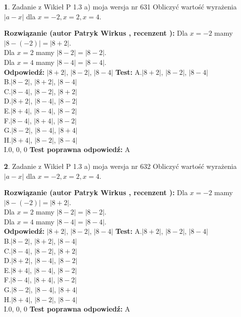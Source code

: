 \documentclass[12pt, a4paper]{article}
\theoremstyle{definition} %
\newtheorem{zad}{}
\newcommand{\zadStart}[1]{\begin{zad}#1\newline}
\newcommand{\zadStop}{\end{zad}}
\newcommand{\rozwStart}[2]{\noindent \textbf{Rozwiązanie (autor #1 , recenzent #2): }\newline}
\newcommand{\rozwStop}{\newline}
\newcommand{\odpStart}{\noindent \textbf{Odpowiedź:}\newline}
\newcommand{\odpStop}{\newline}
\newcommand{\testStart}{\noindent \textbf{Test:}\newline}
\newcommand{\testStop}{\newline}
\newcommand{\kluczStart}{\noindent \textbf{Test poprawna odpowiedź:}\newline}
\newcommand{\kluczStop}{\newline}
\begin{document}
\zadStart{Zadanie z Wikieł P 1.3 a) moja wersja nr 631}
Obliczyć wartość wyrażenia $|a - x|$ dla $x=-2,x=2,x=4$.
\zadStop
\rozwStart{Patryk Wirkus}{}
Dla $x = -2$ mamy $|8 - (-2)| = |8 + 2|$.\\
Dla $x = 2$ mamy $|8 - 2| = |8 - 2|$.\\
Dla $x = 4$ mamy $|8 - 4| = |8 - 4|$.\\
\rozwStop
\odpStart
$|8 + 2|$, $|8 - 2|$, $|8 - 4|$
\odpStop
\testStart
A.$|8 + 2|$, $|8 - 2|$, $|8 - 4|$\\
B.$|8 - 2|$, $|8 + 2|$, $|8 - 4|$\\
C.$|8 - 4|$, $|8 - 2|$, $|8 + 2|$\\
D.$|8 + 2|$, $|8 - 4|$, $|8 - 2|$\\
E.$|8 + 4|$, $|8 - 4|$, $|8 - 2|$\\
F.$|8 - 4|$, $|8 + 4|$, $|8 - 2|$\\
G.$|8 - 2|$, $|8 - 4|$, $|8 + 4|$\\
H.$|8 + 4|$, $|8 - 2|$, $|8 - 4|$\\
I.$0$, $0$, $0$
\testStop
\kluczStart
A
\kluczStop



\zadStart{Zadanie z Wikieł P 1.3 a) moja wersja nr 632}
Obliczyć wartość wyrażenia $|a - x|$ dla $x=-2,x=2,x=4$.
\zadStop
\rozwStart{Patryk Wirkus}{}
Dla $x = -2$ mamy $|8 - (-2)| = |8 + 2|$.\\
Dla $x = 2$ mamy $|8 - 2| = |8 - 2|$.\\
Dla $x = 4$ mamy $|8 - 4| = |8 - 4|$.\\
\rozwStop
\odpStart
$|8 + 2|$, $|8 - 2|$, $|8 - 4|$
\odpStop
\testStart
A.$|8 + 2|$, $|8 - 2|$, $|8 - 4|$\\
B.$|8 - 2|$, $|8 + 2|$, $|8 - 4|$\\
C.$|8 - 4|$, $|8 - 2|$, $|8 + 2|$\\
D.$|8 + 2|$, $|8 - 4|$, $|8 - 2|$\\
E.$|8 + 4|$, $|8 - 4|$, $|8 - 2|$\\
F.$|8 - 4|$, $|8 + 4|$, $|8 - 2|$\\
G.$|8 - 2|$, $|8 - 4|$, $|8 + 4|$\\
H.$|8 + 4|$, $|8 - 2|$, $|8 - 4|$\\
I.$0$, $0$, $0$
\testStop
\kluczStart
A
\kluczStop
\end{document}
